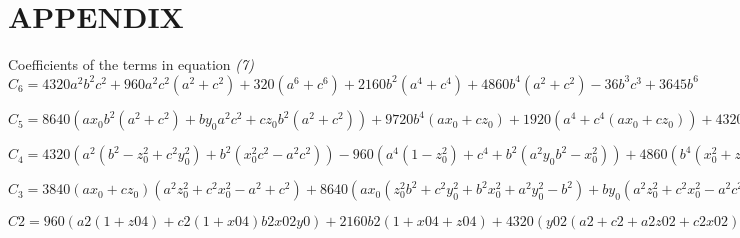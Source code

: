 \chapter{APPENDIX} %

\label{Appendix} %


Coefficients of the terms in equation \textit{(7)} \\

$C_6  = 4320a^2b^2c^2 + 960a^2c^2(a^2 + c^2) + 320(a^6 + c^6) + 2160b^2(a^4 + c^4) + 4860b^4(a^2 
+ c^2) - 36b^3c^3 + 3645b^6$
  
$C_5  = 8640(ax_0b^2(a^2 + c^2) + by_0a^2c^2  + cz_0b^2(a^2 + c^2)) + 9720b^4(ax_0 + cz_0) + 1920(a^4 
+ c^4(ax_0 + cz_0)) + 4320(a^4 + c^4by_0) + 3840(a^2 + c^2)(ax_0 + cz_0) + 19440(c^2b^2 + ab^2) 
by_0 -­ 108bc(c^2by_0 + cz_0b^2) -­ 320a^2ba^3 + 21870y_0b^5$  

$C_4  = 4320(a^2(b^2 - z_0^2 + c^2y_0^2) + b^2(x_0^2c^2 - a^2c^2)) -­ 960(a^4(1 -­ z_0^2) + c^4 + b^2(a^2y_0 ­ 
b^2 - x_0^2)) + 4860(b^4(x_0^2 + z_0^2 -­ 1)) + 4800(a^4x_0^2 + c4z_0^2)+ 2160y_0^2(a^4 + c^4) + 
5760a^2c^2(x_0^2 + z_0^2) + 7680ax_0cz_0(a^2 + c^2) + 17280((ax_0by_0 + by_0cz_0 )(a^2 + c^2) + 
ax_0cz_0b^2) + 12960b^2(a^4 x_0^2 + c^4z_0^2) + 29160b^2y_0^2(a^2 + c^2) -­ 108bc(b^2z_0^2 + c^2y_0^2)
- 1920a^2c^2 -­ 54675y_0^2b^4 -­ 324z_0c^2b^2y_0 - 640ax_0b^3$    

$C_3 = 3840(ax_0 + cz_0)(a^2z_0^2 + c^2x_0^2 - a^2 + c^2) + 8640(ax_0(z_0^2b^2 + c^2y_0^2 + b^2x_0^2 + 
a^2y_0^2 -­ b^2) + by_0(a^2z_0^2 + c^2x_0^2 - a^2c^2) + cz_0(a^2y_0^2 + b^2x_0^2 + bz_0^2 + c^2y_0^2 - ­ b^2)) + 6400 
(a^3x_0^3 + c^3z_0^3) + 19440by_0(b^2(x_0^2 + z_0^2 -­ 1) + y_0^2(a^2 + c^2)) -­ 36(b^3z_0^3 + c^3y_0^3 ) + 
11520(ax_0cz_0(ax_0 + cz_0))­ - 324by_0cz_0(bz_0 + c + y_0) + 25920by_0(z_0^2c^2 + x_0^2a^2) ­- 
320x_0^2b^3  + 72900y_0^3b^3 + 34560ax_0by_0cz_0 + 58320ax_0b^2y_0^2 -­ 1920ax_0b^2 - y_0 + 
58320cz_0b^2y_0  -­ 960a^2by_0^2$

$C 2  = 960(a 2  (1 + z 04 ) +  c 2  (1 + x 04 ) ­ b 2 x 02 y 0 ) + 2160b 2  (1 +  x 04 +  z 04 ) + 4320 ( y 02 ( 
a 2  +  c 2  +  a 2  z 02  + c 2 x 02 ) + b 2 ( x 02  z 02  ­  x 02  ­ z 02 )) + 4800( x 03  a 2  +  z 03 c 2 ) + 4860 y 04 (a 2 + c 2 ) + 5760(z0 * z0 * c * c * (1.0 + x0 * x0) + x0 * x0 * a * a * (z0 * z0 ­ 1.0)) 
+  7680ax 0 cz 0 (x 02 + z 02  ­ 1­ 1920(a 2 z 02  + c 2 x 02  + ax 0 y 02 b) + 17280(by 0 (ax 03  ­ ax 0  + 
cz 03  ­ cz 0  + az 02 ) + ax 0 cz 0 y 02 ) + 38880bz 03 (ax 0  + cz 0 ) + 12960y 02 (a 2 x 02 ­ c 2  z 0 2 ) + 
29160b 2 y 02 (x 02 + z 02  ­ 1) ­ 180y 0 z 0 c 2 y 02  + b 2 z 02 ) ­ 320a 2 y 03  + 54675y 03 b 2$  

